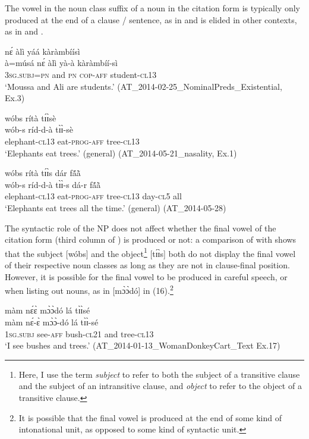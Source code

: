 \documentclass[output=paper]{langsci/langscibook}
\begin{document}
The vowel in the noun class suffix of a noun in the citation form is typically only produced at the end of a clause / sentence, as in  and is elided in other contexts, as in  and .

\ea\label{ex:teo:13}
 n\'ɛ àlì yáá kàràmbíísì\\
à=músá n\'ɛ àlì yà-à kàràmbíí-sì\\
\textsc{3sg.subj=pn} and \textsc{pn} \textsc{cop-aff} student-\textsc{cl13}\\
\glt ‘Moussa and Ali are students.’ (AT\_2014-02-25\_NominalPreds\_Existential, Ex.3)
\z

\ea\label{ex:teo:14}
\glll wóbs rítà t\'ɪ\`ɪsè\\
 wób-s ríd-d-à t\`ɪ\`ɪ-sè\\
elephant-\textsc{cl13} eat-\textsc{prog-aff} tree-\textsc{cl13}\\
\glt ‘Elephants eat trees.’ (general) (AT\_2014-05-21\_nasality, Ex.1)
\z

\ea\label{ex:teo:15}
\glll wóbs rítà t\'ɪ\`ɪs dár f\'{ã}\`{ã}\\
 wób-s ríd-d-à t\`ɪ\`ɪ-s dá-r f\'{ã}\`{ã}\\
elephant-\textsc{cl13} eat-\textsc{prog-aff} tree-\textsc{cl13} day-\textsc{cl5} all\\
\glt ‘Elephants eat trees all the time.’ (general) (AT\_2014-05-28)
\z

The syntactic role of the NP does not affect whether the final vowel of the citation form (third column of ) is produced or not: a comparison of  with  shows that the subject [wóbs] and the object\footnote{Here, I use the term \textit{subject} to refer to both the subject of a transitive clause and the subject of an intransitive clause, and \textit{object} to refer to the object of a transitive clause.} [t\'ɪ\`ɪs] both do not display the final vowel of their respective noun classes as long as they are not in clause-final position. However, it is possible for the final vowel to be produced in careful speech, or when listing out nouns, as in [m\`ɔ\`ɔdó] in (16).\footnote{It is possible that the final vowel is produced at the end of some kind of intonational unit, as opposed to some kind of syntactic unit.}

\ea\label{ex:teo:16}
\glll màm n\'ɛ\`ɛ m\`ɔ\`ɔdó lá t\`ɪ\`ɪsé\\
 màm n\'ɛ-\`ɛ m\`ɔ\`ɔ-dó lá t\`ɪ\`ɪ-sé\\
1\textsc{sg.subj} see-\textsc{aff} bush-\textsc{cl21} and tree-\textsc{cl13}\\
\glt ‘I see bushes and trees.’ (AT\_2014-01-13\_WomanDonkeyCart\_Text Ex.17)
\z
\end{document}

